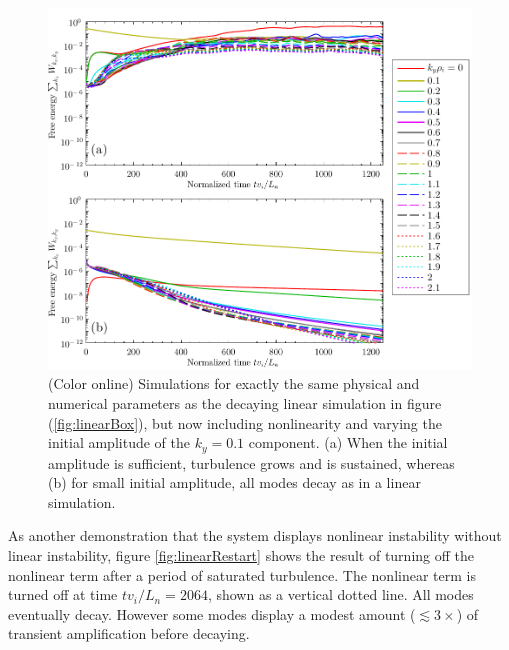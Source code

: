 \documentclass[12pt,superscriptaddress]{revtex4}
\begin{document}
\begin{figure}[h!]
\includegraphics[width=6.5in]{m20141125_02_WVsTimeForPaper_amplitudeDependence.pdf}
\caption{(Color online)
Simulations for exactly the same physical and numerical parameters as the decaying
linear simulation in figure (\ref{fig:linearBox}), but now including nonlinearity and varying the
initial amplitude of the $k_y=0.1$ component.
(a) When the initial amplitude is sufficient, turbulence grows and is sustained, whereas (b) for small initial amplitude,
all modes decay as in a linear simulation.
\label{fig:amplitudeDependence}}
\end{figure}

As another demonstration that the system displays nonlinear instability without linear instability,
figure \ref{fig:linearRestart} shows the result of
turning off the nonlinear term after a period of saturated turbulence.
The nonlinear term is turned off at time $t v_i / L_n = 2064$, shown as a vertical
dotted line.  All modes eventually decay.
However some modes
display a modest amount ($\lesssim 3\times$) of transient amplification before decaying.
\end{document}
